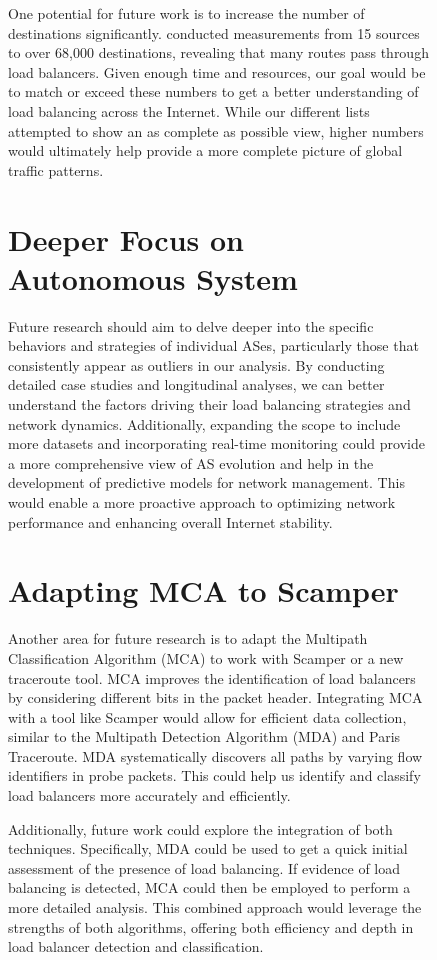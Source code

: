 \documentclass[12pt]{cwru_thesis}
\begin{document}
\begin{figure}[h!]
One potential for future work is to increase the number of destinations significantly. \textbf{\cite{augustin2010measuring} }conducted measurements from 15 sources to over 68,000 destinations, revealing that many routes pass through load balancers. Given enough time and resources, our goal would be to match or exceed these numbers to get a better understanding of load balancing across the Internet. While our different lists attempted to show an as complete as possible view, higher numbers would ultimately help provide a more complete picture of global traffic patterns.

\section*{Deeper Focus on Autonomous System}
Future research should aim to delve deeper into the specific behaviors and strategies of individual ASes, particularly those that consistently appear as outliers in our analysis. By conducting detailed case studies and longitudinal analyses, we can better understand the factors driving their load balancing strategies and network dynamics. Additionally, expanding the scope to include more datasets and incorporating real-time monitoring could provide a more comprehensive view of AS evolution and help in the development of predictive models for network management. This would enable a more proactive approach to optimizing network performance and enhancing overall Internet stability.

\section*{Adapting MCA to Scamper}

Another area for future research is to adapt the Multipath Classification Algorithm (MCA) to work with Scamper or a new traceroute tool. MCA improves the identification of load balancers by considering different bits in the packet header. Integrating MCA with a tool like Scamper would allow for efficient data collection, similar to the Multipath Detection Algorithm (MDA) and Paris Traceroute. MDA systematically discovers all paths by varying flow identifiers in probe packets. This could help us identify and classify load balancers more accurately and efficiently. 

Additionally, future work could explore the integration of both techniques. Specifically, MDA could be used to get a quick initial assessment of the presence of load balancing. If evidence of load balancing is detected, MCA could then be employed to perform a more detailed analysis. This combined approach would leverage the strengths of both algorithms, offering both efficiency and depth in load balancer detection and classification.



\end{figure}
\end{document}
